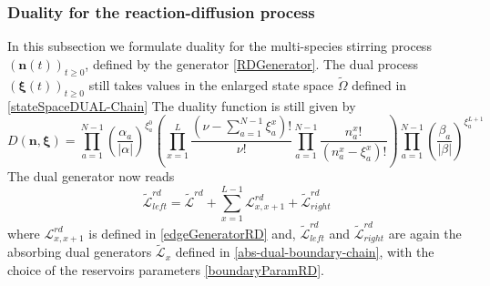\documentclass[10pt]{article}
\numberwithin{equation}{section}
\numberwithin{equation}{subsection}
\begin{document}
\subsubsection{Duality for the reaction-diffusion process}
In this subsection we formulate duality for the multi-species stirring process $(\bm{n}(t))_{t\geq 0}$, defined by the generator \eqref{RDGenerator}.
The dual  process $(\bm{\xi}(t))_{t\geq 0}$ still takes values in the enlarged state space $\widetilde{\Omega}$ defined in \eqref{stateSpaceDUAL-Chain}
The duality function is still given by
\begin{equation}
	D(\bm{n},\bm{\xi})=\prod_{a=1}^{N-1}\left(\frac{\alpha_{a}}{|\alpha|}\right)^{\xi_{a}^{0}}\left(\prod_{x=1}^{L}\frac{(\nu -\sum_{a=1}^{N-1}\xi_{a}^{x})!}{\nu!}\prod_{a=1}^{N-1}\frac{n_{a}^{x}!}{(n_{a}^{x}-\xi_{a}^{x})!}\right)\prod_{a=1}^{N-1}\left(\frac{\beta_{a}}{|\beta|}\right)^{\xi_{a}^{L+1}}
\end{equation}
The dual generator now reads
\begin{equation}\label{DualGeneratorRD}
	\widetilde{\mathcal{L}}_{left}^{rd}=\widetilde{\mathcal{L}}^{rd}+\sum_{x=1}^{L-1}\mathcal{L}_{x,x+1}^{rd}+\widetilde{\mathcal{L}}_{right}^{rd}
\end{equation}
where 
$\mathcal{L}_{x,x+1}^{rd}$ is defined in \eqref{edgeGeneratorRD} and, $\widetilde{\mathcal{L}}_{left}^{rd}$ and $\widetilde{\mathcal{L}}_{right}^{rd}$ are again the absorbing dual generators $\widetilde{\mathcal{L}}_{x}$ defined in \eqref{abs-dual-boundary-chain}, with the choice of the reservoirs parameters \eqref{boundaryParamRD}.
\end{document}
